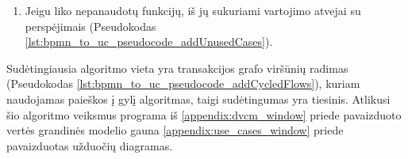 \begin{enumerate}
	

	\item Jeigu liko nepanaudotų funkcijų, iš jų sukuriami vartojimo atvejai su perspėjimais (Pseudokodas \ref{lst:bpmn_to_uc_pseudocode_addUnusedCases}).

	
\end{enumerate}

Sudėtingiausia algoritmo vieta yra transakcijos grafo viršūnių radimas (Pseudokodas  \ref{lst:bpmn_to_uc_pseudocode_addCycledFlows}), kuriam naudojamas paieškos į gylį algoritmas, taigi sudėtingumas yra tiesinis. Atlikusi šio algoritmo veiksmus programa iš \ref{appendix:dvcm_window} priede pavaizduoto vertės grandinės modelio gauna \ref{appendix:use_cases_window} priede pavaizduotas užduočių diagramas.
